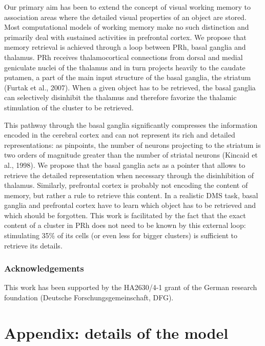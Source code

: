 \documentclass[
  11pt,
  a4paper,
]{scrbook}
\begin{document}
Our primary aim has been to extend the concept of visual working memory
to association areas where the detailed visual properties of an object
are stored. Most computational models of working memory make no such
distinction and primarily deal with sustained activities in prefrontal
cortex. We propose that memory retrieval is achieved through a loop
between PRh, basal ganglia and thalamus. PRh receives thalamocortical
connections from dorsal and medial geniculate nuclei of the thalamus and
in turn projects heavily to the caudate putamen, a part of the main
input structure of the basal ganglia, the striatum (Furtak et al.,
2007). When a given object has to be retrieved, the basal ganglia can
selectively disinhibit the thalamus and therefore favorize the thalamic
stimulation of the cluster to be retrieved.

This pathway through the basal ganglia significantly compresses the
information encoded in the cerebral cortex and can not represent its
rich and detailed representations: as pinpoints, the number of neurons
projecting to the striatum is two orders of magnitude greater than the
number of striatal neurons (Kincaid et al., 1998). We propose that the
basal ganglia acts as a pointer that allows to retrieve the detailed
representation when necessary through the disinhibition of thalamus.
Similarly, prefrontal cortex is probably not encoding the content of
memory, but rather a rule to retrieve this content. In a realistic DMS
task, basal ganglia and prefrontal cortex have to learn which object has
to be retrieved and which should be forgotten. This work is facilitated
by the fact that the exact content of a cluster in PRh does not need to
be known by this external loop: stimulating 35\% of its cells (or even
less for bigger clusters) is sufficient to retrieve its details.

\subsubsection*{Acknowledgements}\label{acknowledgements}

This work has been supported by the HA2630/4-1 grant of the German
research foundation (Deutsche Forschungsgemeinschaft, DFG).

\section*{Appendix: details of the
model}\label{appendix-details-of-the-model}
\end{document}
